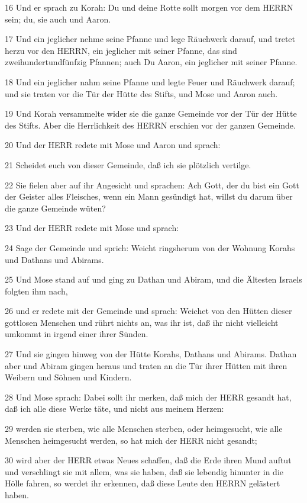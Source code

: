 \par 16 Und er sprach zu Korah: Du und deine Rotte sollt morgen vor dem HERRN sein; du, sie auch und Aaron.
\par 17 Und ein jeglicher nehme seine Pfanne und lege Räuchwerk darauf, und tretet herzu vor den HERRN, ein jeglicher mit seiner Pfanne, das sind zweihundertundfünfzig Pfannen; auch Du Aaron, ein jeglicher mit seiner Pfanne.
\par 18 Und ein jeglicher nahm seine Pfanne und legte Feuer und Räuchwerk darauf; und sie traten vor die Tür der Hütte des Stifts, und Mose und Aaron auch.
\par 19 Und Korah versammelte wider sie die ganze Gemeinde vor der Tür der Hütte des Stifts. Aber die Herrlichkeit des HERRN erschien vor der ganzen Gemeinde.
\par 20 Und der HERR redete mit Mose und Aaron und sprach:
\par 21 Scheidet euch von dieser Gemeinde, daß ich sie plötzlich vertilge.
\par 22 Sie fielen aber auf ihr Angesicht und sprachen: Ach Gott, der du bist ein Gott der Geister alles Fleisches, wenn ein Mann gesündigt hat, willst du darum über die ganze Gemeinde wüten?
\par 23 Und der HERR redete mit Mose und sprach:
\par 24 Sage der Gemeinde und sprich: Weicht ringsherum von der Wohnung Korahs und Dathans und Abirams.
\par 25 Und Mose stand auf und ging zu Dathan und Abiram, und die Ältesten Israels folgten ihm nach,
\par 26 und er redete mit der Gemeinde und sprach: Weichet von den Hütten dieser gottlosen Menschen und rührt nichts an, was ihr ist, daß ihr nicht vielleicht umkommt in irgend einer ihrer Sünden.
\par 27 Und sie gingen hinweg von der Hütte Korahs, Dathans und Abirams. Dathan aber und Abiram gingen heraus und traten an die Tür ihrer Hütten mit ihren Weibern und Söhnen und Kindern.
\par 28 Und Mose sprach: Dabei sollt ihr merken, daß mich der HERR gesandt hat, daß ich alle diese Werke täte, und nicht aus meinem Herzen:
\par 29 werden sie sterben, wie alle Menschen sterben, oder heimgesucht, wie alle Menschen heimgesucht werden, so hat mich der HERR nicht gesandt;
\par 30 wird aber der HERR etwas Neues schaffen, daß die Erde ihren Mund auftut und verschlingt sie mit allem, was sie haben, daß sie lebendig hinunter in die Hölle fahren, so werdet ihr erkennen, daß diese Leute den HERRN gelästert haben.

